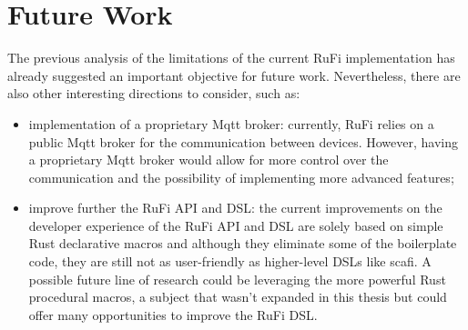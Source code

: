 \section{Future Work}
The previous analysis of the limitations of the current RuFi implementation has already suggested an important objective for future work.
Nevertheless, there are also other interesting directions to consider, such as:

\begin{itemize}
      \item implementation of a proprietary Mqtt broker: currently, RuFi relies on a public Mqtt broker for the communication between devices.
            However, having a proprietary Mqtt broker would allow for more control over the communication and the possibility of implementing more advanced features;
      \item improve further the RuFi API and DSL: the current improvements on the developer experience of the RuFi API and DSL are solely based on simple Rust declarative macros and although they eliminate
            some of the boilerplate code, they are still not as user-friendly as higher-level DSLs like \ac{scafi}. A possible future line of research could be leveraging the more powerful Rust procedural macros, a subject that wasn't expanded in this thesis
            but could offer many opportunities to improve the RuFi DSL.
\end{itemize}